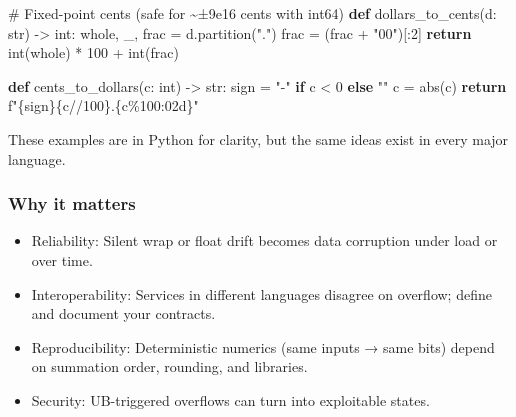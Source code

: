 \documentclass[
  letterpaper,
  DIV=11,
  numbers=noendperiod]{scrreprt}
\newenvironment{Shaded}{\begin{snugshade}}{\end{snugshade}}
\newcommand{\BuiltInTok}[1]{\textcolor[rgb]{0.00,0.23,0.31}{#1}}
\newcommand{\CommentTok}[1]{\textcolor[rgb]{0.37,0.37,0.37}{#1}}
\newcommand{\ControlFlowTok}[1]{\textcolor[rgb]{0.00,0.23,0.31}{\textbf{#1}}}
\newcommand{\DecValTok}[1]{\textcolor[rgb]{0.68,0.00,0.00}{#1}}
\newcommand{\KeywordTok}[1]{\textcolor[rgb]{0.00,0.23,0.31}{\textbf{#1}}}
\newcommand{\NormalTok}[1]{\textcolor[rgb]{0.00,0.23,0.31}{#1}}
\newcommand{\OperatorTok}[1]{\textcolor[rgb]{0.37,0.37,0.37}{#1}}
\newcommand{\SpecialCharTok}[1]{\textcolor[rgb]{0.37,0.37,0.37}{#1}}
\newcommand{\SpecialStringTok}[1]{\textcolor[rgb]{0.13,0.47,0.30}{#1}}
\newcommand{\StringTok}[1]{\textcolor[rgb]{0.13,0.47,0.30}{#1}}
\providecommand{\tightlist}{%
  \setlength{\itemsep}{0pt}\setlength{\parskip}{0pt}}
\begin{document}
\begin{Shaded}
\begin{Highlighting}[]
\CommentTok{\# Fixed{-}point cents (safe for \textasciitilde{}±9e16 cents with int64)}
\KeywordTok{def}\NormalTok{ dollars\_to\_cents(d: }\BuiltInTok{str}\NormalTok{) }\OperatorTok{{-}\textgreater{}} \BuiltInTok{int}\NormalTok{:}
\NormalTok{    whole, \_, frac }\OperatorTok{=}\NormalTok{ d.partition(}\StringTok{"."}\NormalTok{)}
\NormalTok{    frac }\OperatorTok{=}\NormalTok{ (frac }\OperatorTok{+} \StringTok{"00"}\NormalTok{)[:}\DecValTok{2}\NormalTok{]}
    \ControlFlowTok{return} \BuiltInTok{int}\NormalTok{(whole) }\OperatorTok{*} \DecValTok{100} \OperatorTok{+} \BuiltInTok{int}\NormalTok{(frac)}

\KeywordTok{def}\NormalTok{ cents\_to\_dollars(c: }\BuiltInTok{int}\NormalTok{) }\OperatorTok{{-}\textgreater{}} \BuiltInTok{str}\NormalTok{:}
\NormalTok{    sign }\OperatorTok{=} \StringTok{"{-}"} \ControlFlowTok{if}\NormalTok{ c }\OperatorTok{\textless{}} \DecValTok{0} \ControlFlowTok{else} \StringTok{""}
\NormalTok{    c }\OperatorTok{=} \BuiltInTok{abs}\NormalTok{(c)}
    \ControlFlowTok{return} \SpecialStringTok{f"}\SpecialCharTok{\{}\NormalTok{sign}\SpecialCharTok{\}\{}\NormalTok{c}\OperatorTok{//}\DecValTok{100}\SpecialCharTok{\}}\SpecialStringTok{.}\SpecialCharTok{\{}\NormalTok{c}\OperatorTok{\%}\DecValTok{100}\SpecialCharTok{:02d\}}\SpecialStringTok{"}
\end{Highlighting}
\end{Shaded}

These examples are in Python for clarity, but the same ideas exist in
every major language.

\subsubsection{Why it matters}\label{why-it-matters-10}

\begin{itemize}
\tightlist
\item
  Reliability: Silent wrap or float drift becomes data corruption under
  load or over time.
\item
  Interoperability: Services in different languages disagree on
  overflow; define and document your contracts.
\item
  Reproducibility: Deterministic numerics (same inputs → same bits)
  depend on summation order, rounding, and libraries.
\item
  Security: UB-triggered overflows can turn into exploitable states.
\end{itemize}
\end{document}
